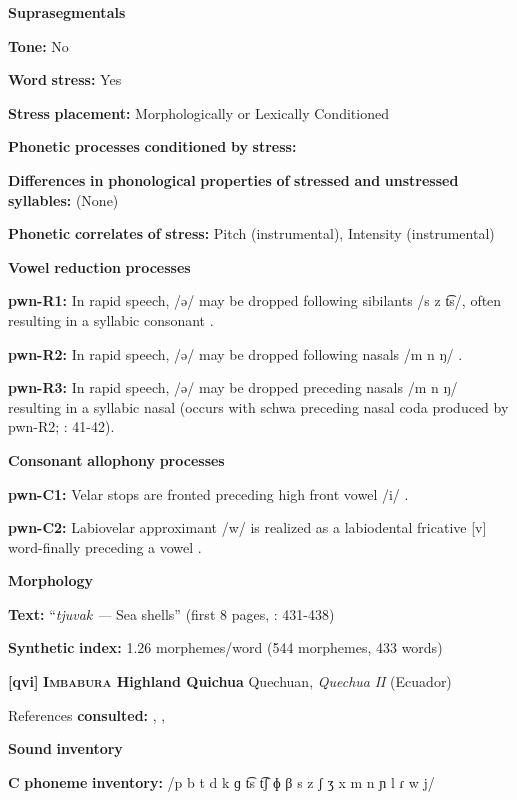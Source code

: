\begin{styleBody}
\textbf{Suprasegmentals}

\textbf{Tone:} No

\textbf{Word} \textbf{stress:} Yes

\textbf{Stress} \textbf{placement:} Morphologically or Lexically Conditioned

\textbf{Phonetic} \textbf{processes} \textbf{conditioned} \textbf{by} \textbf{stress:}

\textbf{Differences} \textbf{in} \textbf{phonological} \textbf{properties} \textbf{of} \textbf{stressed} \textbf{and} \textbf{unstressed} \textbf{syllables:} (None)

\textbf{Phonetic} \textbf{correlates} \textbf{of} \textbf{stress:} Pitch (instrumental), Intensity (instrumental)

\textbf{Vowel} \textbf{reduction} \textbf{processes}

\textbf{pwn-R1:} In rapid speech, /ə/ may be dropped following sibilants /s z t͡s/, often resulting in a syllabic consonant \citep[40-41]{Chang2006}.

\textbf{pwn-R2:} In rapid speech, /ə/ may be dropped following nasals /m n ŋ/ \citep[41]{Chang2006}.

\textbf{pwn-R3:} In rapid speech, /ə/ may be dropped preceding nasals /m n ŋ/ resulting in a syllabic nasal (occurs with schwa preceding nasal coda produced by pwn-R2; \citealt{Chang2006}: 41-42).

\textbf{Consonant} \textbf{allophony} \textbf{processes}

\textbf{pwn-C1:} Velar stops are fronted preceding high front vowel /i/ \citep[22]{Chang2006}.

\textbf{pwn-C2:} Labiovelar approximant /w/ is realized as a labiodental fricative [v] word-finally preceding a vowel \citep[40]{Chang2006}.

\textbf{Morphology}

\textbf{Text:} “\textit{tjuvak} \textit{—} Sea shells” (first 8 pages, \citealt{Chang2006}: 431-438)

\textbf{Synthetic} \textbf{index:} 1.26 morphemes/word (544 morphemes, 433 words)

\textbf{[qvi]}   \textbf{\textsc{Imbabura} \textbf{Highland} \textbf{Quichua}}    Quechuan, \textit{Quechua} \textit{II} (Ecuador)

References \textbf{consulted:} \citet{Carpenter1982}, \citet{Cole1982}, \citet{Jake1983}

\textbf{Sound} \textbf{inventory}

\textbf{C} \textbf{phoneme} \textbf{inventory:} /p b t d k ɡ t͡s t͡ʃ ɸ β s z ʃ ʒ x m n ɲ l ɾ w j/


\end{styleBody}
